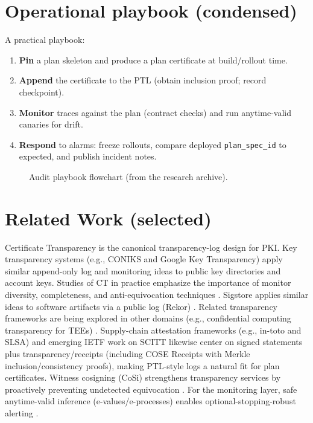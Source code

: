 \documentclass[11pt]{article}
\begin{document}
\section{Operational playbook (condensed)}
A practical playbook:
\begin{enumerate}[leftmargin=*]
  \item \textbf{Pin} a plan skeleton and produce a plan certificate at build/rollout time.
  \item \textbf{Append} the certificate to the PTL (obtain inclusion proof; record checkpoint).
  \item \textbf{Monitor} traces against the plan (contract checks) and run anytime-valid canaries for drift.
  \item \textbf{Respond} to alarms: freeze rollouts, compare deployed \texttt{plan\_spec\_id} to expected, and publish incident notes.
\end{enumerate}

\begin{figure}[t]
  \centering
  \caption{Audit playbook flowchart (from the research archive).}
  \label{fig:playbook}
\end{figure}

\section{Related Work (selected)}
Certificate Transparency \cite{rfc6962,rfc9162} is the canonical transparency-log design for PKI.
Key transparency systems (e.g., CONIKS and Google Key Transparency) apply similar append-only log and monitoring ideas to public key directories and account keys.\cite{coniks2015,keyTransparencyGoogle}
Studies of CT in practice emphasize the importance of monitor diversity, completeness, and anti-equivocation techniques \cite{liCTInWild2019,sunCTMonitorsNDSS2024,dahlbergAggCTGossip2019}.
Sigstore applies similar ideas to software artifacts via a public log (Rekor) \cite{newmanSigstore2022,rekorDocs}. Related transparency frameworks are being explored in other domains (e.g., confidential computing transparency for TEEs) \cite{cctTransparency2024}.
Supply-chain attestation frameworks (e.g., in-toto and SLSA) and emerging IETF work on SCITT likewise center on signed statements plus transparency/receipts (including COSE Receipts with Merkle inclusion/consistency proofs), making PTL-style logs a natural fit for plan certificates.\cite{torresAriasInToto2019,slsaSpecV12,scittArchitectureDraft2025,scittWGAbout2026,scittReceiptsCcfProfile2026,coseMerkleTreeProofs2025}
Witness cosigning (CoSi) strengthens transparency services by proactively preventing undetected equivocation \cite{sytaCoSi2016}.
For the monitoring layer, safe anytime-valid inference (e-values/e-processes) enables optional-stopping-robust alerting \cite{ramdasSAVIStatSci2023,shaferTestingByBetting,ramdasEvaluesEbook2025}.
\end{document}
